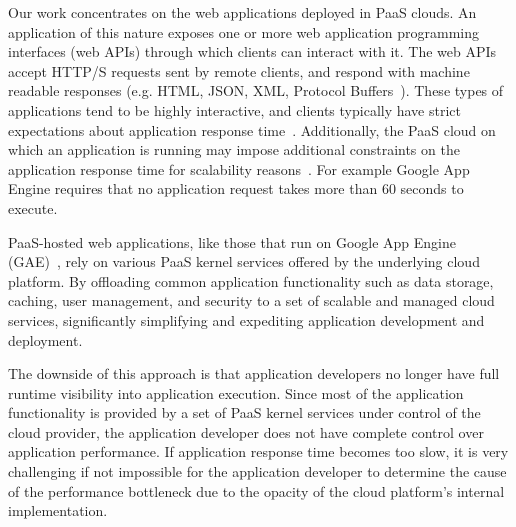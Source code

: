 

Our work concentrates on the web
applications deployed in PaaS clouds. An application of this nature exposes
one or more web application programming interfaces (web APIs) through which
clients can interact with it. The web APIs accept HTTP/S requests sent by
remote clients, and respond with machine readable responses (e.g. HTML, JSON,
XML, Protocol Buffers~\cite{protobuff}). These types of applications tend to be highly
interactive, and clients typically have strict expectations about application
response time~\cite{latency-matters}. 
Additionally, the PaaS cloud on
which an application is running may impose additional constraints on the
application response time for scalability
reasons~\cite{azure-limits,gae-limits}.  For example Google App Engine
requires that no application request takes more than 60 seconds to execute.

PaaS-hosted web applications, like those that run on Google App Engine
(GAE)~\cite{gae},  
rely on various PaaS kernel services offered by the underlying
cloud platform. 
By offloading common application functionality such as data storage, caching,
user management, and security to a set of scalable and
managed cloud services, significantly simplifying and expediting 
application development and deployment.

The downside of this approach is that application developers no longer have full runtime visibility
into application execution. Since most of the application functionality is provided by a set 
of PaaS kernel services under control of the cloud provider, the application
developer does not have complete control over application performance. If application 
response time becomes too slow, it is very challenging if not impossible
for the application developer to determine
the cause of the performance bottleneck due to the opacity of the cloud
platform's internal implementation. 

